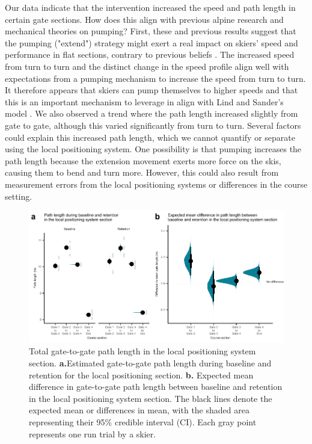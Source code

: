 Our data indicate that the intervention increased the speed and path length in certain gate sections. How does this align with previous alpine research and mechanical theories on pumping? First, these and previous results suggest that the pumping ("extend") strategy might exert a real impact on skiers' speed and performance in flat sections, contrary to previous beliefs \cite{supej_differential_2008, supej_doba_2001}. The increased speed from turn to turn and the distinct change in the speed profile align well with expectations from a pumping mechanism to increase the speed from turn to turn. It therefore appears that skiers can pump themselves to higher speeds and that this is an important mechanism to leverage in align with Lind and Sander's model \cite{lind_physics_2004}. We also observed a trend where the path length increased slightly from gate to gate, although this varied significantly from turn to turn. Several factors could explain this increased path length, which we cannot quantify or separate using the local positioning system. One possibility is that pumping increases the path length because the extension movement exerts more force on the skis, causing them to bend and turn more. However, this could also result from measurement errors from the local positioning systems or differences in the course setting.


\begin{figure}
    \centering
    \includegraphics[width=1\linewidth]{figure/figure_path5.pdf}
    \caption{Total gate-to-gate path length in the local positioning system section. \textbf{a.}Estimated gate-to-gate path length during baseline and retention for the local positioning section. \textbf{b.}
Expected mean difference in gate-to-gate path length between baseline and retention in the
local positioning system section. The black lines denote the expected mean or differences in
mean, with the shaded area representing their 95\% credible interval (CI). Each gray point
represents one run trial by a skier.}
    \label{fig:lps_path}
\end{figure}




